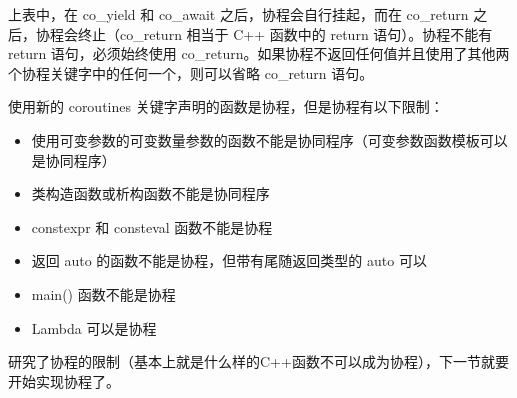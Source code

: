上表中，在 co\_yield 和 co\_await 之后，协程会自行挂起，而在 co\_return 之后，协程会终止（co\_return 相当于 C++ 函数中的 return 语句）。协程不能有 return 语句，必须始终使用 co\_return。如果协程不返回任何值并且使用了其他两个协程关键字中的任何一个，则可以省略 co\_return 语句。


使用新的 coroutines 关键字声明的函数是协程，但是协程有以下限制：

\begin{itemize}
\item
使用可变参数的可变数量参数的函数不能是协同程序（可变参数函数模板可以是协同程序）

\item
类构造函数或析构函数不能是协同程序

\item
constexpr 和 consteval 函数不能是协程

\item
返回 auto 的函数不能是协程，但带有尾随返回类型的 auto 可以

\item
main() 函数不能是协程

\item
Lambda 可以是协程
\end{itemize}

研究了协程的限制（基本上就是什么样的C++函数不可以成为协程），下一节就要开始实现协程了。





















